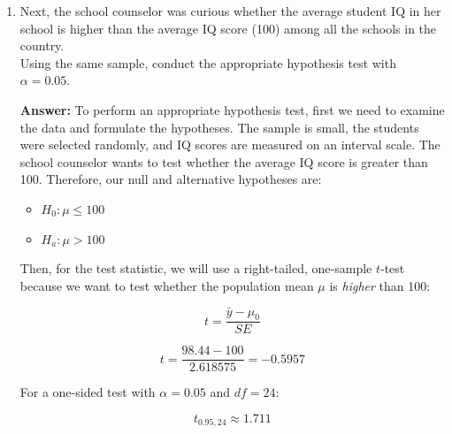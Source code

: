 \documentclass[12pt,letterpaper]{article}
\begin{document}
\begin{enumerate}
Then the $90\%$ CI will be:

$$CI = \bar{y} \pm t(SE)$$
$$CI_{90\%} = 98.44 \pm 1.710882(2.618575) = [93.96,\ 102.92]$$

The CI can also be obtained with this R code:



\begin{verbatim}
 Lower  Upper 
93.96 102.92 
\end{verbatim}

In repeated random sampling, about $90\%$ of intervals made this way
would contain the true school mean.

\

	\item Next, the school counselor was curious  whether  the average student IQ in her school is higher than the average IQ score (100) among all the schools in the country.\\ 
	
	\noindent Using the same sample, conduct the appropriate hypothesis test with $\alpha=0.05$.
	
\vspace{.5cm}
	
\textbf{Answer:} To perform an appropriate hypothesis test, first we need to examine the data and formulate the hypotheses. The sample is small, the students were selected randomly, and IQ scores are measured on an interval scale. The school counselor wants to test whether the average IQ score is greater than 100. Therefore, our null and alternative hypotheses are:

\begin{itemize}
	\item $H_0 \colon \mu \leq 100$
	\item $H_a \colon \mu > 100$  
\end{itemize}

Then, for the test statistic, we will use a right-tailed, one-sample $t$-test because we want to test whether the population mean $\mu$ is \emph{higher} than 100:

$$t = \frac{\bar{y} - \mu_0}{SE}$$

$$t = \frac{98.44 - 100}{2.618575} = -0.5957$$

\vspace{.5cm}

For a one-sided test with $\alpha = 0.05$ and $df = 24$:

$$t_{0.95, 24} \approx 1.711$$


\end{enumerate}
\end{document}
